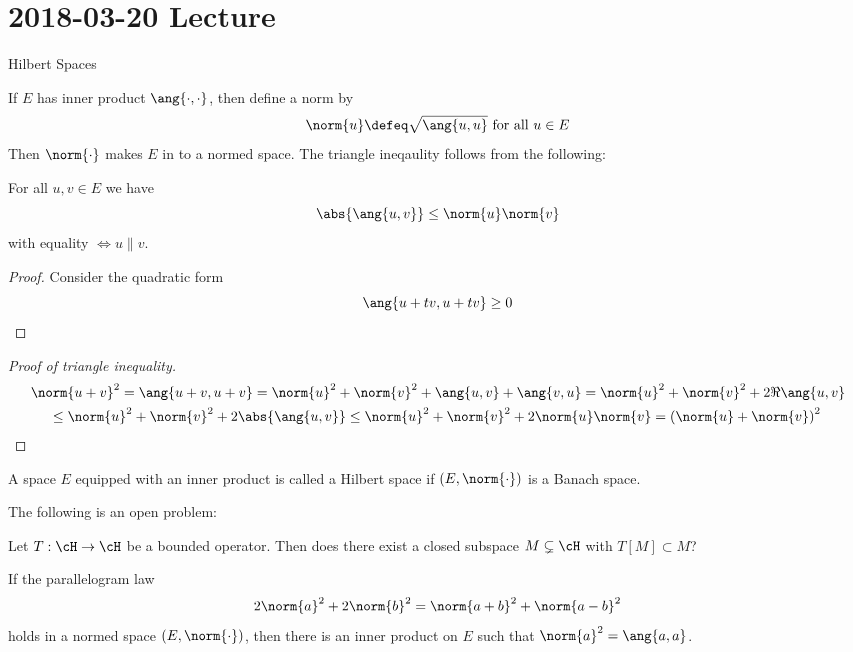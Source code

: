 \section{2018-03-20 Lecture}

Hilbert Spaces

\begin{prop}
	If $E$ has inner product $\ang{\cdot,\cdot}$, then define a norm by
	\[\norm{u} \defeq \sqrt{\ang{u,u}} \text{ for all } u \in E\]
	Then $\norm{\cdot}$ makes $E$ in to a normed space.
	The triangle ineqaulity follows from the following:
\end{prop}

\begin{prop}
	For all $u,v \in E$ we have
	\[\abs{\ang{u,v}} \leq \norm{u}\norm{v}\]
	with equality $\iff u \parallel v$.
\end{prop}

\begin{proof}
	Consider the quadratic form
	\[\ang{u+tv,u+tv} \geq 0 \qedhere\]
\end{proof}

\begin{proof}[Proof of triangle inequality]
	\begin{multline*}
		\norm{u+v}^2 = \ang{u+v,u+v} = \norm{u}^2+\norm{v}^2+\ang{u,v}+\ang{v,u} = \norm{u}^2+\norm{v}^2+2\Re\ang{u,v} \\
		\leq \norm{u}^2+\norm{v}^2 + 2\abs{\ang{u,v}} \leq \norm{u}^2+\norm{v}^2+2\norm{u}\norm{v} = \left(\norm{u}+\norm{v}\right)^2 \qedhere
	\end{multline*}
\end{proof}

\begin{defn}
	A space $E$ equipped with an inner product is called a Hilbert space if $(E,\norm{\cdot})$ is a Banach space.
\end{defn}

\begin{rmk}
	The following is an open problem:
	
	Let $T: \cH \to \cH$ be a bounded operator.
	Then does there exist a closed subspace $M \subsetneq \cH$ with $T[M] \subset M$?
\end{rmk}

\begin{prop}
	If the parallelogram law
	\[2\norm{a}^2 + 2\norm{b}^2 = \norm{a+b}^2 + \norm{a-b}^2\]
	holds in a normed space $(E,\norm{\cdot})$, then there is an inner product on $E$ such that $\norm{a}^2=\ang{a,a}$.
\end{prop}


